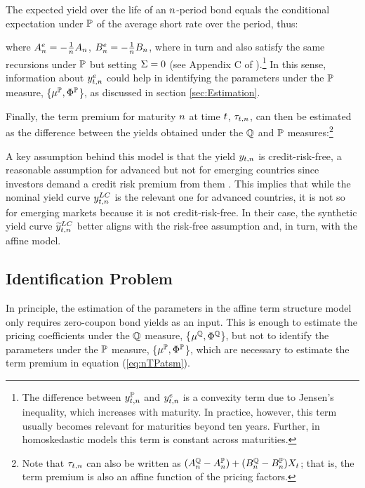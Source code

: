 {The expected yield over the life of an \(n\)-period bond equals the conditional expectation under \(\mathbb{P}\) of the average short rate over the period, thus:
	
\noindent where \(A_{n}^{e} = - \frac{1}{n} A_{n}\), \(B_{n}^{e} = - \frac{1}{n} B_{n}\), where in turn  and  also satisfy the same recursions under \(\mathbb{P}\) but setting \(\Sigma = 0\) (see Appendix C of \cite{Guimaraes:2014}).\footnote{ The difference between \(y_{t,n}^{\mathbb{P}}\) and \(y_{t,n}^{e}\) is a convexity term due to Jensen's inequality, which increases with maturity. In practice, however, this term usually becomes relevant for maturities beyond ten years. Further, in homoskedastic models this term is constant across maturities.}
In this sense, information about \(y_{t,n}^{e}\) could help in identifying the parameters under the \(\mathbb{P}\) measure, \{\(\mu^{\mathbb{P}}, \Phi^{\mathbb{P}}\)\}, as discussed in section \ref{sec:Estimation}.

Finally, the term premium for maturity \(n\) at time \(t\), \(\tau_{t,n}\), can then be estimated as the difference between the yields obtained under the \(\mathbb{Q}\) and \(\mathbb{P}\) measures:\footnote{ Note that \(\tau_{t,n}\) can also be written as \( (A_{n}^{\mathbb{Q}} - A_{n}^{\mathbb{P}}) + (B_{n}^{\mathbb{Q}}  - B_{n}^{\mathbb{P}}) X_{t} \); that is, the term premium is also an affine function of the pricing factors.}
	
A key assumption behind this model is that the yield $y_{t,n}$ is credit-risk-free, a reasonable assumption for advanced but not for emerging countries since investors demand a credit risk premium from them \citep{DuSchreger:2016JoF}. 
This implies that while the nominal yield curve \(y_{t,n} ^{LC}\) is the relevant one for advanced countries, it is not so for emerging markets because it is not credit-risk-free.
In their case, the synthetic yield curve \(\widetilde{y}_{t,n} ^{LC}\) better aligns with the risk-free assumption and, in turn, with the affine model.

\subsection{Identification Problem} \label{sec:Identification}
\iftoggle{toclinks}{\gototoc}{} %

In principle, the estimation of the parameters in the affine term structure model only  requires zero-coupon bond yields as an input.
This is enough to estimate the pricing coefficients under the $\mathbb{Q}$ measure,
\{\(\mu^{\mathbb{Q}}, \Phi^{\mathbb{Q}}\)\}, but not to identify the parameters under the $\mathbb{P}$ measure, 
\{\(\mu^{\mathbb{P}}, \Phi^{\mathbb{P}}\)\}, which are necessary to estimate the term premium in equation (\ref{eq:nTPatsm}).

}
